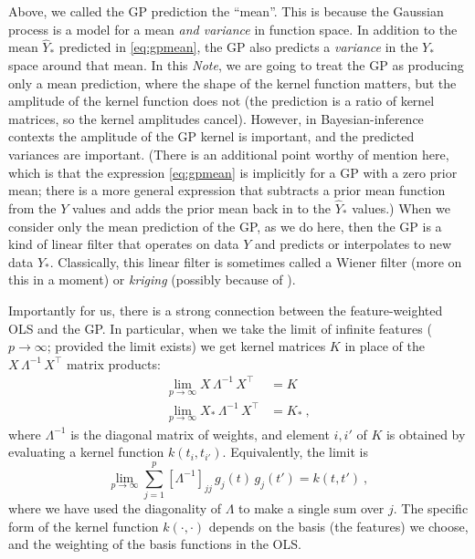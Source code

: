 \documentclass[12pt,letterpaper]{article}
\newcommand{\documentname}{\textsl{Note}}
\begin{document}
Above, we called the GP prediction the ``mean''. This is because the Gaussian process is a model for a mean \emph{and variance} in function space.
In addition to the mean $\hat{Y}_\ast$ predicted in \eqref{eq:gpmean}, the GP also predicts a \emph{variance} in the $Y_\ast$ space around that mean.
In this \documentname, we are going to treat the GP as producing only a mean prediction, where the shape of the kernel function matters, but the amplitude of the kernel function does not (the prediction is a ratio of kernel matrices, so the kernel amplitudes cancel).
However, in Bayesian-inference contexts the amplitude of the GP kernel is important, and the predicted variances are important.
(There is an additional point worthy of mention here, which is that the expression \eqref{eq:gpmean} is implicitly for a GP with a zero prior mean; there is a more general expression that subtracts a prior mean function from the $Y$ values and adds the prior mean back in to the $\hat{Y}_\ast$ values.)
When we consider only the mean prediction of the GP, as we do here, then the GP is a kind of linear filter that operates on data $Y$ and predicts or interpolates to new data $Y_\ast$.
Classically, this linear filter is sometimes called a Wiener filter (more on this in a moment) or \emph{kriging} (possibly because of \citealt{krige}).

Importantly for us, there is a strong connection between the feature-weighted OLS and the GP.
In particular, when we take the limit of infinite features ($p\rightarrow\infty$; provided the limit exists) we get kernel matrices $K$ in place of the $X\,\Lambda^{-1}\,X^\top$ matrix products:
\begin{align}
    \lim_{p\rightarrow\infty} X\,\Lambda^{-1}\,X^\top &= K
    \\
    \lim_{p\rightarrow\infty} X_\ast\,\Lambda^{-1}\,X^\top &= K_\ast
    ~,
    \label{eq.limit}
\end{align}
where $\Lambda^{-1}$ is the diagonal matrix of weights, and element $i,i'$ of $K$ is obtained by evaluating a kernel function $k(t_i,t_{i'})$.
Equivalently, the limit is
\begin{equation}
    \lim_{p\rightarrow\infty} \sum_{j=1}^p [\Lambda^{-1}]_{jj}\,g_j(t)\,g_{j}(t') = k(t, t')
    ~,
\end{equation}
where we have used the diagonality of $\Lambda$ to make a single sum over $j$.
The specific form of the kernel function $k(\cdot,\cdot)$ depends on the basis (the features) we choose, and the weighting of the basis functions in the OLS.
\end{document}
